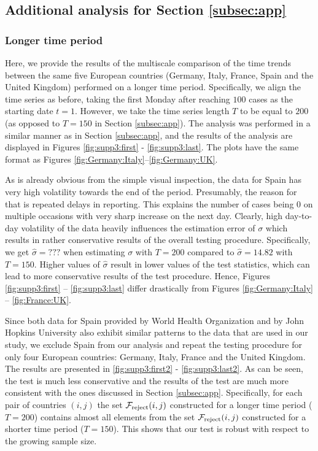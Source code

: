 \documentclass[a4paper,12pt]{article}
\numberwithin{equation}{section}
\begin{document}
{\clearpage
\subsection{Additional analysis for Section \ref{subsec:app}}
\subsubsection{Longer time period}\label{s:subsec:app:3}


Here, we provide the results of the multiscale comparison of the time trends between the same five European countries (Germany, Italy, France, Spain and the United Kingdom) performed on a longer time period. Specifically, we align the time series as before, taking the first Monday after reaching $100$ cases as the starting date $t = 1$. However, we take the time series length $T$ to be equal to $200$ (as opposed to $T = 150$ in Section \ref{subsec:app}). The analysis was performed in a similar manner as in Section \ref{subsec:app}, and the results of the analysis are displayed in Figures \ref{fig:supp3:first} - \ref{fig:supp3:last}. The plots have the same format as Figures \ref{fig:Germany:Italy}--\ref{fig:Germany:UK}.

As is already obvious from the simple visual inspection, the data for Spain has very high volatility towards the end of the period. Presumably, the reason for that is repeated delays in reporting. This explains the number of cases being $0$ on multiple occasions with very sharp increase on the next day. Clearly, high day-to-day volatility of the data heavily influences the estimation error of $\sigma$ which results in rather conservative results of the overall testing procedure. Specifically, we get $\hat{\sigma} = ???$ when estimating $\sigma$ with $T=200$ compared to $\hat{\sigma} = 14.82$ with $T = 150$. Higher values of $\hat{\sigma}$ result in lower values of the test statistics, which can lead to more conservative results of the test procedure. Hence, Figures \ref{fig:supp3:first} -- \ref{fig:supp3:last} differ drastically from Figures \ref{fig:Germany:Italy} -- \ref{fig:France:UK}. 


Since both data for Spain provided by World Health Organization and by John Hopkins University also exhibit similar patterns to the data that are used in our study, we exclude Spain from our analysis and repeat the testing procedure for only four European countries: Germany, Italy, France and the United Kingdom. The results are presented in \ref{fig:supp3:first2} - \ref{fig:supp3:last2}. As can be seen, the test is much less conservative and the results of the test are much more consistent with the ones discussed in Section \ref{subsec:app}. Specifically, for each pair of countries $(i, j)$ the set $\mathcal{F}_{\text{reject}}(i, j)$ constructed for a longer time period ($T = 200$) contains almost all elements from the set $\mathcal{F}_{\text{reject}}(i, j)$ constructed for a shorter time period ($T = 150$). This shows that our test is robust with respect to the growing sample size.


}
\end{document}
